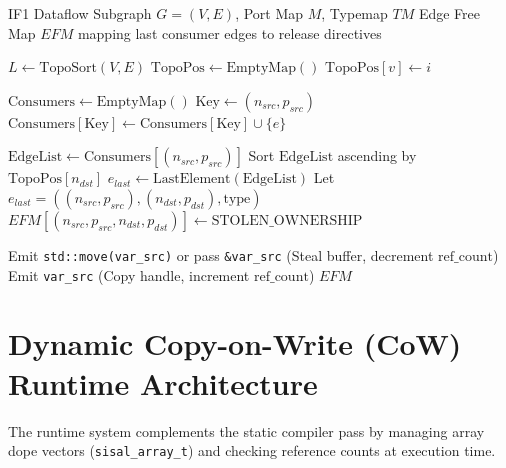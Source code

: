 \begin{algorithm}[H]
\caption{Static Edge Liveness Analysis \& Memory Ownership Pass}
\label{alg:liveness_cow}
\begin{algorithmic}[1]
\REQUIRE IF1 Dataflow Subgraph $G = (V, E)$, Port Map $M$, Typemap $TM$
\ENSURE Edge Free Map $EFM$ mapping last consumer edges to release directives

\STATE {}
\STATE $L \gets \text{TopoSort}(V, E)$
\STATE $\text{TopoPos} \gets \text{EmptyMap}()$
    \STATE $\text{TopoPos}[v] \gets i$
\ENDFOR

\STATE {}
\STATE $\text{Consumers} \gets \text{EmptyMap}()$
    \STATE $\text{Key} \gets (n_{src}, p_{src})$
    \STATE $\text{Consumers}[\text{Key}] \gets \text{Consumers}[\text{Key}] \cup \{ e \}$
\ENDFOR

\STATE {}
    \STATE $\text{EdgeList} \gets \text{Consumers}[(n_{src}, p_{src})]$
    \STATE Sort $\text{EdgeList}$ ascending by $\text{TopoPos}[n_{dst}]$
    \STATE $e_{last} \gets \text{LastElement}(\text{EdgeList})$
    \STATE Let $e_{last} = ((n_{src}, p_{src}), (n_{dst}, p_{dst}), \text{type})$
    \STATE $EFM[(n_{src}, p_{src}, n_{dst}, p_{dst})] \gets \text{STOLEN\_OWNERSHIP}$
\ENDFOR

\STATE {}
        \STATE Emit \texttt{std::move(var\_src)} or pass \texttt{\&var\_src} (Steal buffer, decrement $\text{ref\_count}$)
    \ELSE
        \STATE Emit \texttt{var\_src} (Copy handle, increment $\text{ref\_count}$)
    \ENDIF
\ENDFOR
\RETURN $EFM$
\end{algorithmic}
\end{algorithm}

\section{Dynamic Copy-on-Write (CoW) Runtime Architecture}
The runtime system complements the static compiler pass by managing array dope vectors (\texttt{sisal\_array\_t}) and checking reference counts at execution time.

